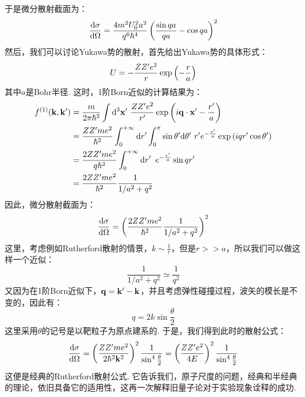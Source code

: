 于是微分散射截面为：
\[
\frac{\dd{\sigma}}{\dd{\Omega}} = \frac{4m^{2}U_{0}^{2}a^{2}}{q^{6}\hbar^{4}}\left({\frac{\sin qa}{qa} - \cos qa}\right)^{2}
\]
然后，我们可以讨论Yukawa势的散射，首先给出Yukawa势的具体形式：
\[
U = -\frac{ZZ'e^{2}}{r}\exp\left({-\frac{r}{a}}\right)
\]
其中\(a\)是Bohr半径. 这时，1阶Born近似的计算结果为：
\begin{align*}
f^{\br{1}}(\vk,\vk')
& = \frac{m}{2\pi\hh^{2}}\int\dd^{3}\vr'\ \frac{ZZ'e^{2}}{r'}\exp\br{i\vq\cdot\vr'-\frac{r'}{a}} \\
& = \frac{ZZ'me^{2}}{\hh^{2}}\int_{0}^{+\infty}\dd{r}'\int_{0}^{\pi}\sin\theta'\dd\theta'\ r'e^{-\frac{r'}{a}}\exp\br{iqr'\cos\theta'} \\
& = \frac{2ZZ'me^{2}}{q\hh^{2}}\int_{0}^{+\infty}\dd{r}'\ e^{-\frac{r'}{a}}\sin qr' \\
& = \frac{2ZZ'me^{2}}{\hh^{2}}\frac{1}{1/a^{2} + q^{2}}
\end{align*}
因此，微分散射截面为：
\[
\frac{\dd{\sigma}}{\dd{\Omega}} = \left({\frac{2ZZ'me^{2}}{\hbar^{2}}\frac{1}{1/a^{2} + q^{2}}}\right)^{2}
\]
这里，考虑例如Rutherford散射的情景，\(k\sim\frac{1}{r}\)，但是\(r>>a\)，所以我们可以做这样一个近似：
\[
\frac{1}{1/a^{2} + q^{2}} \simeq \frac{1}{q^{2}}
\]
又因为在1阶Born近似下，\(\mathbf{q} = \mathbf{k}'-\mathbf{k}\)，并且考虑弹性碰撞过程，波矢的模长是不变的，因此有：
\[
q = 2k\sin\frac{\theta}{2}
\]
这里采用\(\theta\)的记号是以靶粒子为原点建系的. 于是，我们得到此时的散射公式：
\[
\frac{\dd{\sigma}}{\dd{\Omega}} = \left({\frac{ZZ'me^{2}}{2\hbar^{2}\mathbf{k}^{2}}}\right)^{2}\frac{1}{\sin^{4}\frac{\theta}{2}} = \left({\frac{ZZ'e^{2}}{4E}}\right)^{2}\frac{1}{\sin^{4}\frac{\theta}{2}}
\]
这便是经典的Rutherford散射公式. 它告诉我们，原子尺度的问题，经典和半经典的理论，依旧具备它的适用性，这再一次解释旧量子论对于实验现象诠释的成功. 
